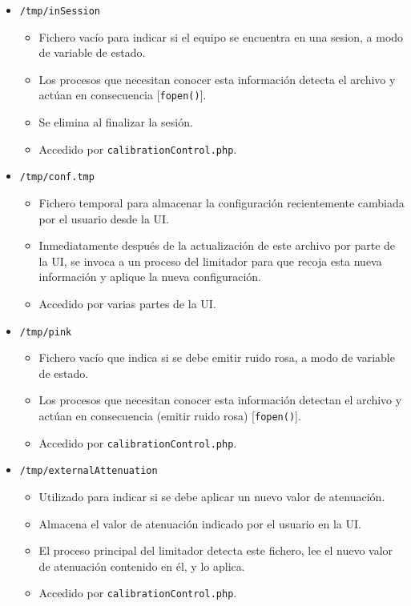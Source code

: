 \begin{itemize}
    \item \verb|/tmp/inSession|
    \begin{itemize}
        \item Fichero vacío para indicar si el equipo se encuentra en una \gls{sesion}, a modo de variable de estado.
        \item Los procesos que necesitan conocer esta información detecta el archivo y actúan en consecuencia [\verb|fopen()|].
        \item Se elimina al finalizar la sesión.
        \item Accedido por \verb|calibrationControl.php|.
    \end{itemize}

    \item \verb|/tmp/conf.tmp|
    \begin{itemize}
        \item Fichero temporal para almacenar la configuración recientemente cambiada por el usuario desde la UI.
        \item Inmediatamente después de la actualización de este archivo por parte de la UI, se invoca a un proceso del limitador para que recoja esta nueva información y aplique la nueva configuración.
        \item Accedido por varias partes de la UI.
    \end{itemize}

    \item \verb|/tmp/pink|
    \begin{itemize}
        \item Fichero vacío que indica si se debe emitir ruido rosa, a modo de variable de estado.
        \item Los procesos que necesitan conocer esta información detectan el archivo y actúan en consecuencia (emitir ruido rosa) [\verb|fopen()|].
        \item Accedido por \verb|calibrationControl.php|.
    \end{itemize}

    \item \verb|/tmp/externalAttenuation|
    \begin{itemize}
        \item Utilizado para indicar si se debe aplicar un nuevo valor de atenuación.
        \item Almacena el valor de atenuación indicado por el usuario en la UI.
        \item El proceso principal del limitador detecta este fichero, lee el nuevo valor de atenuación contenido en él, y lo aplica.
        \item Accedido por \verb|calibrationControl.php|.
    \end{itemize}
\end{itemize}

